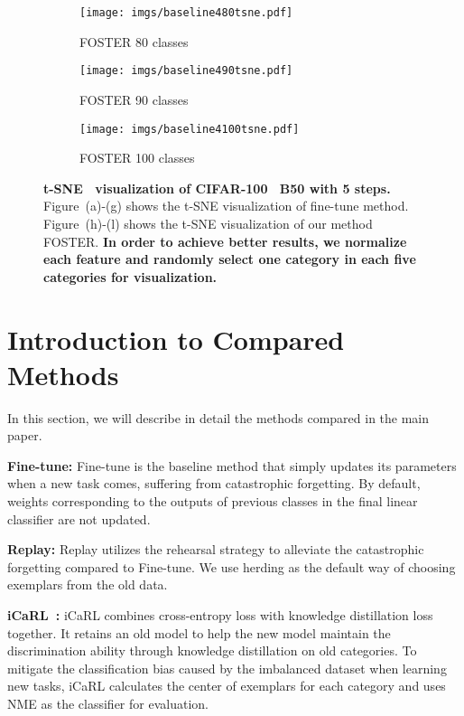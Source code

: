 \documentclass[runningheads]{llncs}
\begin{document}
\begin{figure}[t]
   \begin{subfigure}[b]{0.31\linewidth}
    \texttt{[image: imgs/baseline480tsne.pdf]}
    \caption{FOSTER 80 classes }
    \label{fig:f80}
  \end{subfigure}
  \hfill
   \begin{subfigure}[b]{0.31\linewidth}
    \texttt{[image: imgs/baseline490tsne.pdf]}
    \caption{FOSTER 90 classes }
    \label{fig:f90}
  \end{subfigure}
  \hfill
    \begin{subfigure}[b]{0.31\linewidth}
    \texttt{[image: imgs/baseline4100tsne.pdf]}
    \caption{FOSTER 100 classes }
    \label{fig:f100}
  \end{subfigure}
    \caption{\textbf{t-SNE~\cite{van2008visualizing} visualization of CIFAR-100~\cite{cifar100} B50 with 5 steps.} Figure~(a)-(g) shows the t-SNE visualization of fine-tune method. Figure~(h)-(l) shows the t-SNE visualization of our method FOSTER. \textbf{In order to achieve better results, we normalize each feature and randomly select one category in each five categories for visualization.}}
    \label{fig:ft}
\end{figure}

\section{Introduction to Compared Methods}\label{sec:3}
In this section, we will describe in detail the methods compared in the main paper.

\noindent \textbf{Fine-tune:} Fine-tune is the baseline method that simply updates its parameters when a new task comes, suffering from catastrophic forgetting. By default, weights corresponding to the outputs of previous classes in the final linear classifier are not updated.

\noindent \textbf{Replay:} Replay utilizes the rehearsal strategy to alleviate the catastrophic forgetting compared to Fine-tune. We use herding as the default way of choosing exemplars from the old data.

\noindent \textbf{iCaRL~\cite{icarl}:} iCaRL combines cross-entropy loss with knowledge distillation loss together. It retains an old model to help the new model maintain the discrimination ability through knowledge distillation on old categories. To mitigate the classification bias caused by the imbalanced dataset when learning new tasks, iCaRL calculates the center of exemplars for each category and uses NME as the classifier for evaluation.  
\end{document}
